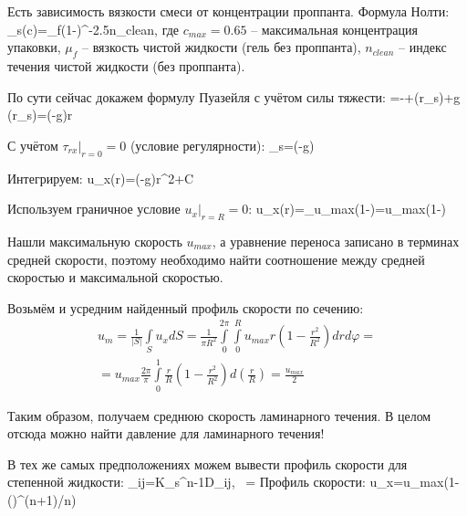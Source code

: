 \documentclass[main.tex]{subfiles}
\begin{document}
Есть зависимость вязкости смеси от концентрации проппанта.
Формула Нолти:
\beq
\mu_s(c)=\mu_f\left(1-\right)^{-2.5n_{clean}},
\eeq
где $c_{max}=0.65$ -- максимальная концентрация упаковки, $\mu_f$ -- вязкость чистой жидкости (гель без проппанта), $n_{clean}$ -- индекс течения чистой жидкости (без проппанта).

По сути сейчас докажем формулу Пуазейля с учётом силы тяжести:
=-+\left(r\mu_s\right)+\rho g \sin{\theta}
\eeq
\beq
{}\left(r\mu_s\right)=\left(-\rho g\sin{\theta}\right)r
\eeq

С учётом $\tau_{rx}|_{r=0}=0$ (условие регулярности):
\beq
\mu_s=\left(-\rho g\sin{\theta}\right)
\eeq

Интегрируем:
\beq
u_x(r)=\left(-\rho g\sin{\theta}\right)r^2+C
\eeq

Используем граничное условие $u_x|_{r=R}=0$:
\beq
u_x(r)=_{u_{max}}\left(1-\right)=u_{max}\left(1-\right)
\eeq

Нашли максимальную скорость $u_{max}$, а уравнение переноса записано в терминах средней скорости, поэтому необходимо найти соотношение между средней скоростью и максимальной скоростью.

Возьмём и усредним найденный профиль скорости по сечению:
\begin{multline}
u_m=\frac{1}{|S|}\int\limits_S{u_xdS}=\frac{1}{\pi R^2}\int\limits_{0}^{2\pi}\int\limits_{0}^{R}u_{max}r\left(1-\frac{r^2}{R^2}\right)drd\varphi=\\=u_{max}\frac{2\pi}{\pi}\int\limits_0^1\frac{r}{R}\left(1-\frac{r^2}{R^2}\right)d\left(\frac{r}{R}\right)=\frac{u_{max}}{2}
\end{multline}

Таким образом, получаем среднюю скорость ламинарного течения.
В целом отсюда можно найти давление для ламинарного течения!

В тех же самых предположениях можем вывести профиль скорости для степенной жидкости:
\beq
\tau_{ij}=K_s\dot{\gamma}^{n-1}D_{ij},\,\,\,\,\,\dot{\gamma}=
\eeq
Профиль скорости:
\beq
u_x=u_{max}\left(1-\left(\right)^{(n+1)/n}\right)
\eeq
\ \\
\end{document}
